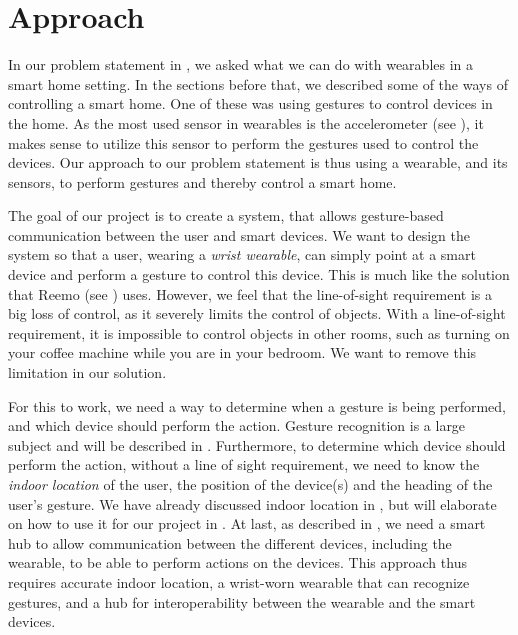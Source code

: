 \section{Approach}\label{sec:approach}
In our problem statement in , 
we asked what we can do with wearables in a smart home setting.
In the sections before that, 
we described some of the ways of controlling a smart home. 
One of these was using gestures to control devices in the home. 
As the most used sensor in wearables is the accelerometer (see ), 
it makes sense to utilize this sensor to perform the gestures used to control the devices. 
Our approach to our problem statement is thus using a wearable, 
and its sensors, to perform gestures and thereby control a smart home. 

The goal of our project is to create a system, 
that allows gesture-based communication between the user and smart devices.
We want to design the system so that a user, wearing a \emph{wrist wearable}, 
can simply point at a smart device and perform a gesture to control this device. 
This is much like the solution that Reemo (see ) uses. 
However, we feel that the line-of-sight requirement is a big loss of control, 
as it severely limits the control of objects.
With a line-of-sight requirement, 
it is impossible to control objects in other rooms, 
such as turning on your coffee machine while you are in your bedroom. 
We want to remove this limitation in our solution. 

For this to work, we need a way to determine when a gesture is being performed, 
and which device should perform the action. 
Gesture recognition is a large subject and will be described in . 
Furthermore, to determine which device should perform the action, 
without a line of sight requirement, 
we need to know the \emph{indoor location} of the user, 
the position of the device(s) and the heading of the user's gesture. 
We have already discussed indoor location in , 
but will elaborate on how to use it for our project in .
At last, as described in , 
we need a smart hub to allow communication between the different devices, 
including the wearable, to be able to perform actions on the devices. 
This approach thus requires accurate indoor location, 
a wrist-worn wearable that can recognize gestures, 
and a hub for interoperability between the wearable and the smart devices. 
 